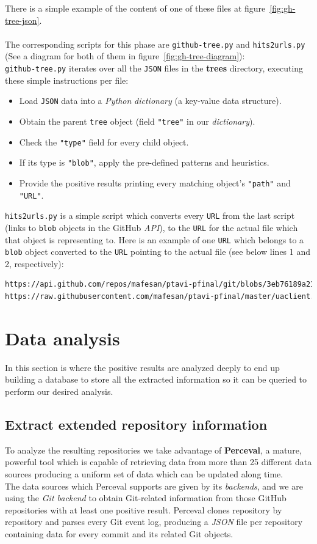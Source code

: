 \documentclass[a4paper, 12pt]{book}
\begin{document}
There is a simple example of the content of one of these files at figure~\ref{fig:gh-tree-json}.\\\\
The corresponding scripts for this phase are \texttt{github-tree.py} and \texttt{hits2urls.py}
(See a diagram for both of them in figure~\ref{fig:gh-tree-diagram}):\\
\texttt{github-tree.py} iterates over all the \texttt{JSON} files in the \textbf{trees} directory,
executing these simple instructions per file:
\begin{itemize}
  \item Load \texttt{JSON} data into a \emph{Python} \textit{dictionary} (a key-value data structure).
  \item Obtain the parent \texttt{tree} object (field \texttt{"tree"} in our \textit{dictionary}).
  \item Check the \texttt{"type"} field for every child object.
  \item If its type is \texttt{"blob"}, apply the pre-defined patterns and heuristics.
  \item Provide the positive results printing every matching object's \texttt{"path"} and \texttt{"URL"}.
\end{itemize}
\texttt{hits2urls.py} is a simple script which converts every \texttt{URL} from the last script (links to \texttt{blob} objects
in the GitHub \textit{API}), to the \texttt{URL} for the actual file which that object is representing to.
Here is an example of one \texttt{URL} which belongs to a \texttt{blob} object converted to the \texttt{URL}
pointing to the actual file (see below lines 1 and 2, respectively):
\begin{lstlisting}[language=bash]
https://api.github.com/repos/mafesan/ptavi-pfinal/git/blobs/3eb76189a21a...
https://raw.githubusercontent.com/mafesan/ptavi-pfinal/master/uaclient.py \end{lstlisting}
\section{Data analysis}
\label{sec:data-analysis}
In this section is where the positive results are analyzed deeply to end up building a database to store
all the extracted information so it can be queried to perform our desired analysis.
\subsection{Extract extended repository information}
\label{ssec:extract-perceval}
To analyze the resulting repositories we take advantage of \textbf{Perceval}, a mature, powerful tool which
is capable of retrieving data from more than 25 different data sources producing a uniform set of data which can be
updated along time.\\
The data sources which Perceval supports are given by its \emph{backends}, and we are using the \emph{Git backend} to
obtain Git-related information from those GitHub repositories with at least one positive result.
Perceval clones repository by repository and parses every Git event log, producing a \emph{JSON} file
per repository containing data for every commit and its related Git objects.\\
\end{document}
